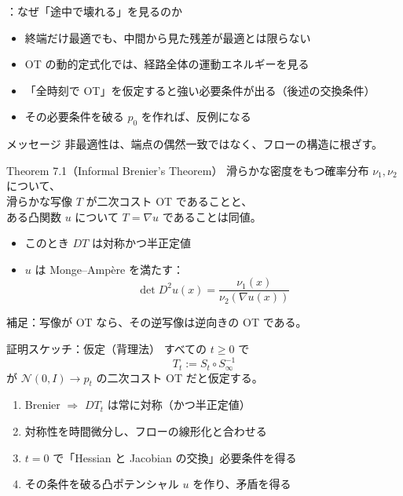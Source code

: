 \assuppl
\begin{frame}{\supplmark：なぜ「途中で壊れる」を見るのか}
    \begin{itemize}
        \item 終端だけ最適でも、中間から見た残差が最適とは限らない
        \item OT の動的定式化では、経路全体の運動エネルギーを見る
        \item 「全時刻で OT」を仮定すると強い必要条件が出る（後述の交換条件）
        \item その必要条件を破る $p_0$ を作れば、反例になる
    \end{itemize}
    \begin{exampleblock}{メッセージ}
        非最適性は、端点の偶然一致ではなく、フローの構造に根ざす。
    \end{exampleblock}
\end{frame}
\asmain
\begin{frame}{Theorem 7.1（Informal Brenier's Theorem）}
    滑らかな密度をもつ確率分布 $\nu_1,\nu_2$ について、\\
    滑らかな写像 $T$ が二次コスト OT であることと、\\
    ある凸関数 $u$ について $T=\nabla u$ であることは同値。
    \begin{itemize}
        \item このとき $DT$ は対称かつ半正定値
        \item $u$ は Monge--Amp\`ere を満たす：
        \[
            \det D^2 u(x)
            =
            \frac{\nu_1(x)}{\nu_2(\nabla u(x))}
        \]
    \end{itemize}
    \vfill
    \footnotesize
    補足：写像が OT なら、その逆写像は逆向きの OT である。
\end{frame}
\asmain
\begin{frame}{証明スケッチ：仮定（背理法）}
    すべての $t\ge 0$ で
    \[
        T_t:=S_t\circ S_\infty^{-1}
    \]
    が $\mathcal{N}(0,I)\to p_t$ の二次コスト OT だと仮定する。
    \begin{enumerate}
        \item Brenier $\Rightarrow$ $DT_t$ は常に対称（かつ半正定値）
        \item 対称性を時間微分し、フローの線形化と合わせる
        \item $t=0$ で「Hessian と Jacobian の交換」必要条件を得る
        \item その条件を破る凸ポテンシャル $u$ を作り、矛盾を得る
    \end{enumerate}
\end{frame}
